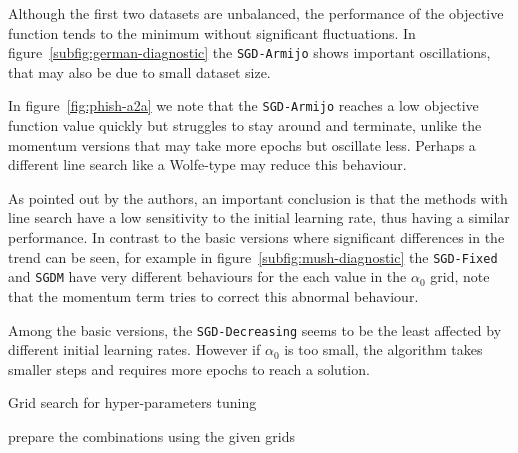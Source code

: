 Although the first two datasets are unbalanced, the performance of the objective function tends to the minimum without significant fluctuations. In figure~\ref{subfig:german-diagnostic} the \texttt{SGD-Armijo} shows important oscillations, that may also be due to small dataset size.


In figure~\ref{fig:phish-a2a} we note that the \texttt{SGD-Armijo} reaches a low objective function value quickly but struggles to stay around and terminate, unlike the momentum versions that may take more epochs but oscillate less. Perhaps a different line search like a Wolfe-type may reduce this behaviour. 

As pointed out by the authors, an important conclusion is that the methods with line search have a low sensitivity to the initial learning rate, thus having a similar performance. In contrast to the basic versions where significant differences in the trend can be seen, for example in figure~\ref{subfig:mush-diagnostic} the \texttt{SGD-Fixed} and \texttt{SGDM} have very different behaviours for the each value in the $\alpha_0$ grid, note that the momentum term tries to correct this abnormal behaviour.

Among the basic versions, the \texttt{SGD-Decreasing} seems to be the least affected by different initial learning rates. However if $\alpha_0$ is too small, the algorithm takes smaller steps and requires more epochs to reach a solution.



\begin{algorithm}
\caption{Grid search for hyper-parameters tuning}\label{alg:grid-search}
prepare the combinations using the given grids\;
\end{algorithm}


